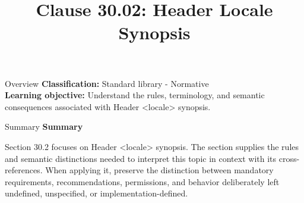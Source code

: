 \documentclass[10pt,letterpaper]{article}
\title{Clause 30.02: Header Locale Synopsis}
\author{}
\date{}
\begin{document}
\maketitle
\begin{CornellOverviewBox}{Overview}
\textbf{Classification:} Standard library - Normative\\[2pt]
\textbf{Learning objective:} Understand the rules, terminology, and semantic consequences associated with Header <locale> synopsis.
\end{CornellOverviewBox}\begin{CornellSummaryBox}{Summary}
{\sffamily\bfseries\color{Accent} Summary}\par\vspace{3pt}Section 30.2 focuses on Header <locale> synopsis. The section supplies the rules and semantic distinctions needed to interpret this topic in context with its cross-references. When applying it, preserve the distinction between mandatory requirements, recommendations, permissions, and behavior deliberately left undefined, unspecified, or implementation-defined.
\end{CornellSummaryBox}
\end{document}

